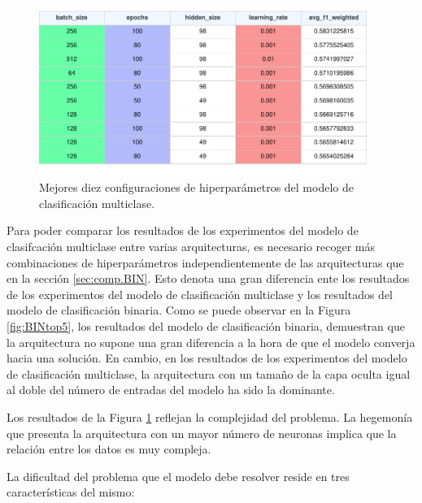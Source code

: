 \begin{figure}[H]
    \centering
    \includegraphics[width=0.95\textwidth]{./img/modelo/resultados/MULtop10.pdf}
    \caption{Mejores diez configuraciones de hiperparámetros del modelo de clasificación multiclase.}
    \label{fig:MULtop10}
\end{figure}

Para poder comparar los resultados de los experimentos del modelo de clasifcación multiclase entre varias arquitecturas, es necesario recoger más combinaciones de hiperparámetros independientemente de las arquitecturas que en la sección \ref{sec:comp.BIN}. Esto denota una gran diferencia ente los resultados de los experimentos del modelo de clasificación multiclase y los resultados del modelo de clasificación binaria. Como se puede observar en la Figura \ref{fig:BINtop5}, los resultados del modelo de clasificación binaria, demuestran que la arquitectura no supone una gran diferencia a la hora de que el modelo converja hacia una solución. En cambio, en los resultados de los experimentos del modelo de clasificación multiclase, la arquitectura con un tamaño de la capa oculta igual al doble del número de entradas del modelo ha sido la dominante.

Los resultados de la Figura \ref{fig:MULtop10} reflejan la complejidad del problema. La hegemonía que presenta la arquitectura con un mayor número de neuronas implica que la relación entre los datos es muy compleja. 

La dificultad del problema que el modelo debe resolver reside en tres características del mismo:

